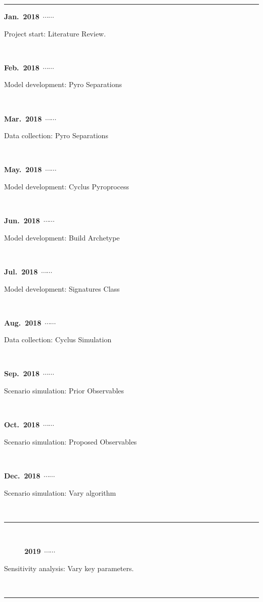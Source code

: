\newcommand\ytl[2]{\parbox[b]{0.3\textwidth}{\hfill{\color{orange!90}\bfseries\sffamily #1}~$\cdots\cdots$~}\makebox[0pt][c]{$\bullet$}\vrule\quad 
\parbox[c]{0.7\textwidth}{\vspace{7pt}\color{dblue!80}\raggedright\sffamily #2\\[7pt]}\\[-3pt]}
\begin{table}
\centering
\begin{minipage}[t]{\linewidth}
\color{gray}
\rule{\linewidth}{1pt}
\ytl{Jan.~2018}{Project start: \hfill Literature Review.}
\ytl{Feb.~2018}{Model development: \hfill Pyro Separations}
\ytl{Mar.~2018}{Data collection: \hfill Pyro Separations}
\ytl{May.~2018}{Model development: \hfill Cyclus Pyroprocess}
\ytl{Jun.~2018}{Model development: \hfill Build Archetype}
\ytl{Jul.~2018}{Model development: \hfill Signatures Class}
\ytl{Aug.~2018}{Data collection: \hfill Cyclus Simulation}
\ytl{Sep.~2018}{Scenario simulation: \hfill Prior Observables}
\ytl{Oct.~2018}{Scenario simulation: \hfill Proposed Observables}
\ytl{Dec.~2018}{Scenario simulation: \hfill Vary algorithm}
\rule{\linewidth}{1pt}%
\\%
\bigskip
\ytl{~~~~~2019}{Sensitivity analysis: \hfill Vary key parameters.}
\bigskip
\rule{\linewidth}{1pt}%
\end{minipage}%
\end{table}
